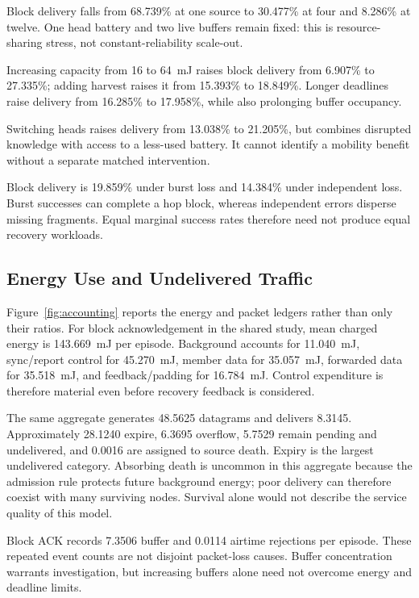 \documentclass[journal,10pt]{IEEEtran}
\begin{document}
Block delivery falls from 68.739\% at one source to 30.477\% at four and 8.286\% at twelve. One head battery and two live buffers remain fixed: this is resource-sharing stress, not constant-reliability scale-out.

Increasing capacity from 16 to 64~mJ raises block delivery from 6.907\% to 27.335\%; adding harvest raises it from 15.393\% to 18.849\%. Longer deadlines raise delivery from 16.285\% to 17.958\%, while also prolonging buffer occupancy.

Switching heads raises delivery from 13.038\% to 21.205\%, but combines disrupted knowledge with access to a less-used battery. It cannot identify a mobility benefit without a separate matched intervention.

Block delivery is 19.859\% under burst loss and 14.384\% under independent loss. Burst successes can complete a hop block, whereas independent errors disperse missing fragments. Equal marginal success rates therefore need not produce equal recovery workloads.



\subsection{Energy Use and Undelivered Traffic}
Figure~\ref{fig:accounting} reports the energy and packet ledgers rather than only their ratios. For block acknowledgement in the shared study, mean charged energy is 143.669~mJ per episode. Background accounts for 11.040~mJ, sync/report control for 45.270~mJ, member data for 35.057~mJ, forwarded data for 35.518~mJ, and feedback/padding for 16.784~mJ. Control expenditure is therefore material even before recovery feedback is considered.

The same aggregate generates 48.5625 datagrams and delivers 8.3145. Approximately 28.1240 expire, 6.3695 overflow, 5.7529 remain pending and undelivered, and 0.0016 are assigned to source death. Expiry is the largest undelivered category. Absorbing death is uncommon in this aggregate because the admission rule protects future background energy; poor delivery can therefore coexist with many surviving nodes. Survival alone would not describe the service quality of this model.

Block ACK records 7.3506 buffer and 0.0114 airtime rejections per episode. These repeated event counts are not disjoint packet-loss causes. Buffer concentration warrants investigation, but increasing buffers alone need not overcome energy and deadline limits.
\end{document}
